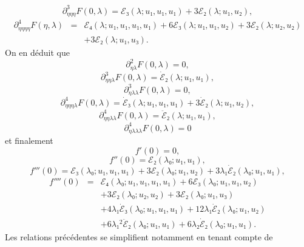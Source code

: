 \documentclass[12pt, final]{amsart}
\theoremstyle{definition}
\begin{document}
\begin{equation} \partial_{η  η  η}^3 F (0, λ) =ℰ₃
   (λ ; u₁, u₁, u₁) + 3ℰ₂ (λ ; u₁, u₂), \end{equation}
\begin{eqnarray}
  \partial_{η  η  η  η}^4 F (η,
  λ) & = & ℰ₄ (λ ; u₁, u₁, u₁, u₁) + 6ℰ₃
  (λ ; u₁, u₁, u₂) + 3ℰ₂ (λ ; u₂, u₂) \nonumber\\
  &  &  + 3ℰ₂ (λ ; u₁, u₃) . \nonumber
\end{eqnarray}
On en déduit que
\begin{equation} \partial_{η  λ}^2 F (0, λ) = 0, \end{equation}
\begin{equation} \partial_{η  η  λ}^3 F (0, λ) =
   \dot{ℰ}₂ (λ ; u₁, u₁), \end{equation}
\begin{equation} \partial_{η  λ  λ}^3 F (0, λ) = 0, \end{equation}
\begin{equation} \partial_{η  η  η  λ}^4 F (0,
   λ) = \dot{ℰ}₃ (λ ; u₁, u₁, u₁) + 3
   \dot{ℰ}₂ (λ ; u₁, u₂), \text{} \text{} \end{equation}
\begin{equation} \partial_{η  η  λ  λ}^4 F (0,
   λ) = \ddot{ℰ}₂ (λ ; u₁, u₁), \end{equation}
\begin{equation} \partial_{η  λ  λ  λ}^4 F (0,
   λ) = 0 \end{equation}
et finalement
\begin{equation} f' (0) = 0, \end{equation}
\begin{equation} f'' (0) =ℰ₂ (λ₀ ; u₁, u₁), \end{equation}
\begin{equation} f''' (0) =ℰ₃ (λ₀ ; u₁, u₁, u₁) + 3ℰ₂
   (λ₀ ; u₁, u₂) + 3 λ₁  \dot{ℰ}₂ (λ₀ ; u₁,
   u₁), \end{equation}
\begin{eqnarray}
  f'''' (0) & = & ℰ₄ (λ₀ ; u₁, u₁, u₁, u₁) +
  6ℰ₃ (λ₀ ; u₁, u₁, u₂) \nonumber\\
  &  &  + 3ℰ₂ (λ₀ ; u₂, u₂) + 3ℰ₂
  (λ₀ ; u₁, u₃) \nonumber\\
  &  &  + 4 λ₁  \dot{ℰ}₃ (λ₀ ; u₁, u₁,
  u₁) + 12 λ₁  \dot{ℰ}₂ (λ₀ ; u₁, u₂) \nonumber\\
  &  &  + 6 λ₁^2  \ddot{ℰ}₂ (λ₀ ; u₁, u₁)
  + 6 λ₂  \dot{ℰ}₂ (λ₀ ; u₁, u₁) . \nonumber
\end{eqnarray}
Les relations précédentes se simplifient notamment en tenant compte de
\end{document}

